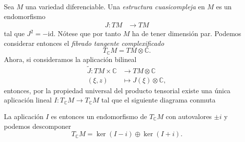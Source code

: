 \documentclass[12pt,a4paper,twoside]{article}
\theoremstyle{definition} \newtheorem{defn}[thm]{Definición}
\theoremstyle{definition} \newtheorem{ejemplo}[thm]{Ejemplo}
\theoremstyle{definition} \newtheorem{ejercicio}[thm]{Ejercicio}
\theoremstyle{remark} \newtheorem*{obs}{Observación}
\def\CC{\mathbb{C}}
\begin{document}
Sea $M$ una variedad diferenciable. Una \emph{estructura cuasicompleja} en $M$ es un endomorfismo
\begin{align*}
  J :TM&\longrightarrow TM
  \end{align*}
  tal que $J^2=-\mathrm{id}$. Nótese que por tanto $M$ ha de tener dimensión par. Podemos considerar entonces el \emph{fibrado tangente complexificado}
  \begin{equation*}
    T_{\CC}M=TM\otimes \CC.
  \end{equation*}
Ahora, si consideramos la aplicación bilineal
\begin{align*}
  \tilde{J} :TM \times \CC&\longrightarrow TM\otimes \CC\\ 
    (\xi,z) &\longmapsto J(\xi)\otimes \CC, 
  \end{align*}
  entonces, por la propiedad universal del producto tensorial existe una única aplicación lineal $I:T_{\CC}M \rightarrow T_{\CC}M$ tal que el siguiente diagrama conmuta
  \begin{center}
   \end{center}
   La aplicación $I$ es entonces un endomorfismo de $T_{\CC}M$ con autovalores $\pm i$ y podemos descomponer
   \begin{equation*}
     T_{\CC}M=\ker(I-i)\oplus \ker(I+i).
   \end{equation*}
\end{document}
